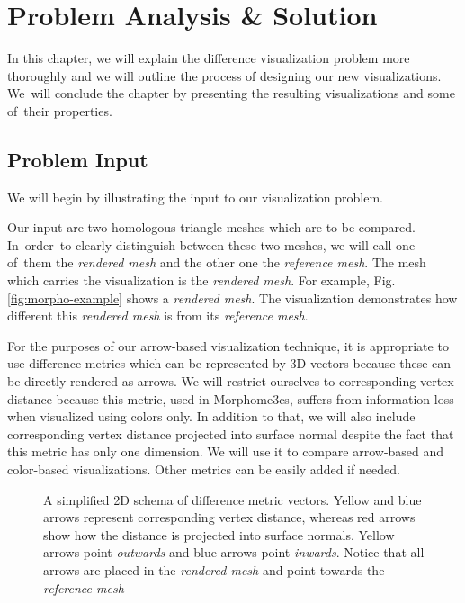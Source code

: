 \chapter{Problem Analysis \& Solution}
\label{chap:analysis}

In this chapter, we will explain the difference visualization problem more thoroughly and we will outline the process of designing our new visualizations. We~will conclude the chapter by presenting the resulting visualizations and some of~their properties.

\section{Problem Input}
\label{sec:analysis-input}

We will begin by illustrating the input to our visualization problem.

Our input are two homologous triangle meshes which are to be compared. In~order~to clearly distinguish between these two meshes, we will call one of~them the {\it rendered mesh} and the other one the {\it reference mesh}. The mesh which carries the visualization is the {\it rendered mesh}. For example, Fig. \ref{fig:morpho-example} shows a {\it rendered mesh}. The visualization demonstrates how different this {\it rendered mesh} is from its {\it reference mesh}.

For the purposes of our arrow-based visualization technique, it is appropriate to use difference metrics which can be represented by 3D vectors because these can be directly rendered as arrows. We will restrict ourselves to corresponding vertex distance because this metric, used in Morphome3cs, suffers from information loss when visualized using colors only. In addition to that, we will also include corresponding vertex distance projected into surface normal despite the fact that this metric has only one dimension. We will use it to compare arrow-based and color-based visualizations. Other metrics can be easily added if needed.

\begin{figure}[h]
	\centering
	\def\svgwidth{\textwidth}
	
	\caption[Input illustration]{A simplified 2D schema of difference metric vectors. Yellow and blue arrows represent corresponding vertex distance, whereas red arrows show how the distance is projected into surface normals. Yellow arrows point {\it outwards} and blue arrows point {\it inwards}. Notice that all arrows are placed in the {\it rendered mesh} and point towards the {\it reference mesh}}
	\label{fig:illustration-problem_input}
\end{figure}

